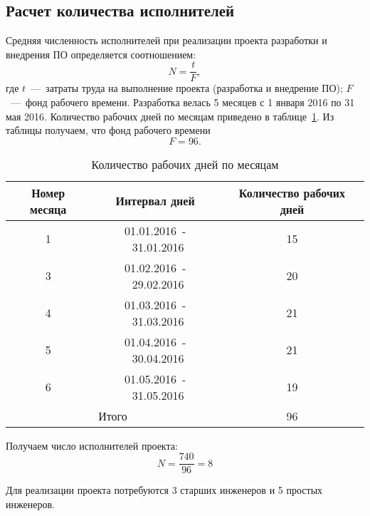     \subsection{Расчет количества исполнителей}
    \label{subsec:slaves}
        Средняя численность исполнителей при реализации проекта разработки и внедрения ПО определяется соотношением:
        $$N=\dfrac {t} {F},$$
        где $t$~---~затраты труда на выполнение проекта (разработка и внедрение ПО); $F$~---~фонд рабочего времени.
        Разработка велась 5 месяцев с 1 января 2016 по 31 мая 2016.
        Количество рабочих дней по месяцам приведено в таблице~\ref{tabular:work_day}. Из таблицы получаем, что фонд рабочего времени $$F=96.$$
        \begin{table}[h!]
            \caption{Количество рабочих дней по месяцам\bigskip}
            \centering
            \label{tabular:work_day}
            \begin{tabular}{|c|c|c|}
                \hline
                \bf{Номер месяца} & \bf{Интервал дней}& \bf{Количество рабочих дней} \\ \hline
                1 & 01.01.2016~-~31.01.2016 & 15 \\ \hline
                3 & 01.02.2016~-~29.02.2016 & 20 \\ \hline
                4 & 01.03.2016~-~31.03.2016 & 21 \\ \hline
                5 & 01.04.2016~-~30.04.2016 & 21 \\ \hline
                6 & 01.05.2016~-~31.05.2016 & 19 \\ \hline
                \multicolumn{2}{|c|}{Итого} & 96 \\ \hline
            \end{tabular}
        \end{table}

        Получаем число исполнителей проекта:
        $$N=\dfrac{740}{96}=8$$

        Для реализации проекта потребуются 3 старших инженеров и 5 простых инженеров.

    \clearpage
